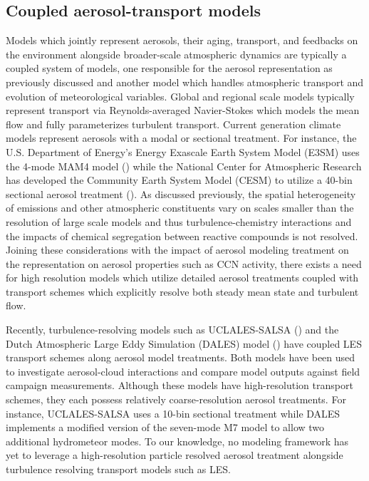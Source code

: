 \subsection{Coupled aerosol-transport models}
Models which jointly represent aerosols, their aging, transport, and feedbacks on the environment alongside broader-scale atmospheric dynamics are typically a coupled system of models, one responsible for the aerosol representation as previously discussed and another model which handles atmospheric transport and evolution of meteorological variables. Global and regional scale models typically represent transport via Reynolds-averaged Navier-Stokes which models the mean flow and fully parameterizes turbulent transport. Current generation climate models represent aerosols with a modal or sectional treatment. For instance, the U.S. Department of Energy's Energy Exascale Earth System Model (E3SM) uses the 4-mode MAM4 model (\cite{golaz_doe_2022}) while the National Center for Atmospheric Research has developed the Community Earth System Model (CESM) to utilize a 40-bin sectional aerosol treatment (\cite{tilmes_description_2023}). As discussed previously, the spatial heterogeneity of emissions and other atmospheric constituents vary on scales smaller than the resolution of large scale models and thus turbulence-chemistry interactions and the impacts of chemical segregation between reactive compounds is not resolved. Joining these considerations with the impact of aerosol modeling treatment on the representation on aerosol properties such as CCN activity, there exists a need for high resolution models which utilize detailed aerosol treatments coupled with transport schemes which explicitly resolve both steady mean state and turbulent flow.

Recently, turbulence-resolving models such as UCLALES-SALSA (\cite{tonttila_uclalessalsa_2017}) and the Dutch Atmospheric Large Eddy Simulation (DALES) model (\cite{de_bruine_explicit_2019}) have coupled LES transport schemes along aerosol model treatments. Both models have been used to investigate aerosol-cloud interactions and compare model outputs against field campaign measurements. Although these models have high-resolution transport schemes, they each possess relatively coarse-resolution aerosol treatments. For instance, UCLALES-SALSA uses a 10-bin sectional treatment while DALES implements a modified version of the seven-mode M7 model to allow two additional hydrometeor modes. To our knowledge, no modeling framework has yet to leverage a high-resolution particle resolved aerosol treatment alongside turbulence resolving transport models such as LES. 

